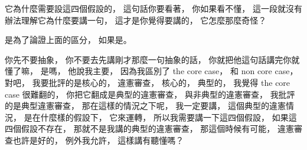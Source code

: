 \hypertarget{w06:cue:1240}{}它為什麼需要設這四個假設的，
\hypertarget{w06:cue:1241}{}這句話你要看著，
\hypertarget{w06:cue:1242}{}你如果看不懂，
\hypertarget{w06:cue:1243}{}這一段就沒有辦法理解它為什麼要講一句，
\hypertarget{w06:cue:1244}{}這才是你覺得要講的，
\hypertarget{w06:cue:1245}{}它怎麼那麼奇怪？

\hypertarget{w06:cue:1246}{}是為了論證上面的區分，
\hypertarget{w06:cue:1247}{}如果是。

\hypertarget{w06:cue:1248}{}你先不要抽象，
\hypertarget{w06:cue:1249}{}你不要去先講剛才那麼一句抽象的話，
\hypertarget{w06:cue:1250}{}你就把他這句話講完你就懂了嘛，
\hypertarget{w06:cue:1251}{}是嗎，
\hypertarget{w06:cue:1252}{}他說我主要，
\hypertarget{w06:cue:1253}{}因為我區別了 the core case，
\hypertarget{w06:cue:1254}{}和 non core case，
\hypertarget{w06:cue:1255}{}對吧，
\hypertarget{w06:cue:1256}{}我要批評的是核心的，
\hypertarget{w06:cue:1257}{}違憲審查，
\hypertarget{w06:cue:1258}{}核心的，
\hypertarget{w06:cue:1259}{}典型的，
\hypertarget{w06:cue:1260}{}我覺得 the core case 很難翻的，
\hypertarget{w06:cue:1261}{}你把它翻成是典型的違憲審查，
\hypertarget{w06:cue:1262}{}與非典型的違憲審查，
\hypertarget{w06:cue:1263}{}我批評的是典型違憲審查，
\hypertarget{w06:cue:1264}{}那在這樣的情況之下呢，
\hypertarget{w06:cue:1265}{}我一定要講，
\hypertarget{w06:cue:1266}{}這個典型的違憲情況，
\hypertarget{w06:cue:1267}{}是在什麼樣的假設下，
\hypertarget{w06:cue:1268}{}它來運轉，
\hypertarget{w06:cue:1269}{}所以我需要講一下這四個假設，
\hypertarget{w06:cue:1270}{}如果這四個假設不存在，
\hypertarget{w06:cue:1271}{}那就不是我講的典型的違憲審查，
\hypertarget{w06:cue:1272}{}那這個時候有可能，
\hypertarget{w06:cue:1273}{}違憲審查也許是好的，
\hypertarget{w06:cue:1274}{}例外我允許，
\hypertarget{w06:cue:1275}{}這樣講有聽懂嗎？

